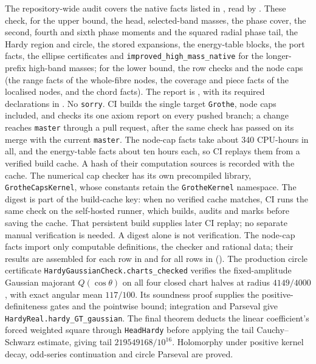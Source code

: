 \documentclass[11pt,a4paper]{article}
\newcommand{\lean}[1]{\texttt{\small #1}}
\begin{document}
The repository-wide audit covers the native facts listed in , read by . These check, for the upper bound, the head, selected-band masses, the phase cover, the second, fourth and sixth phase moments and the squared radial phase tail, the Hardy region and circle, the stored expansions, the energy-table blocks, the port facts, the ellipse certificates and
\lean{improved\_high\_mass\_native} for the longer-prefix high-band masses;
for the lower bound, the row checks and the node caps (the range facts of the whole-fibre nodes, the coverage and piece facts of the localised nodes, and the chord facts).
The report is , with its required declarations in .
No \lean{sorry}. CI builds the single target \lean{Grothe}, node caps included, and checks its one axiom report on every pushed branch; a change reaches \texttt{master} through a pull request, after the same check has passed on its merge with the current \texttt{master}.
The node-cap facts take about 340 CPU-hours in all, and the energy-table facts about ten hours each, so CI replays them from a verified build cache.
A hash of their computation sources is recorded with the cache. The numerical cap checker has its own precompiled library,
\lean{GrotheCapsKernel}, whose constants retain the \lean{GrotheKernel} namespace.
The digest is part of the build-cache key: when no verified cache matches, CI runs the same check on
the self-hosted runner, which builds, audits and marks  before saving
the cache. That persistent build supplies later CI replay; no separate manual verification is needed.
A digest alone is not verification. The node-cap facts import only computable definitions, the checker and rational
data; their results are assembled for each row in  and for all rows in
 ().
The production circle certificate \lean{HardyGaussianCheck.charts\_checked} verifies the
fixed-amplitude Gaussian majorant $Q(\cos\theta)$ on all four closed chart halves
at radius $4149/4000$, with exact angular mean $117/100$.
Its soundness proof supplies the positive-definiteness gates and the pointwise bound;
integration and Parseval give \lean{HardyReal.hardy\_GT\_gaussian}. The final theorem deducts
the linear coefficient's forced weighted square through \lean{HeadHardy} before applying
the tail Cauchy--Schwarz estimate, giving tail $219549168/10^{16}$.
Holomorphy under positive kernel decay, odd-series continuation and circle Parseval are proved.
\end{document}
